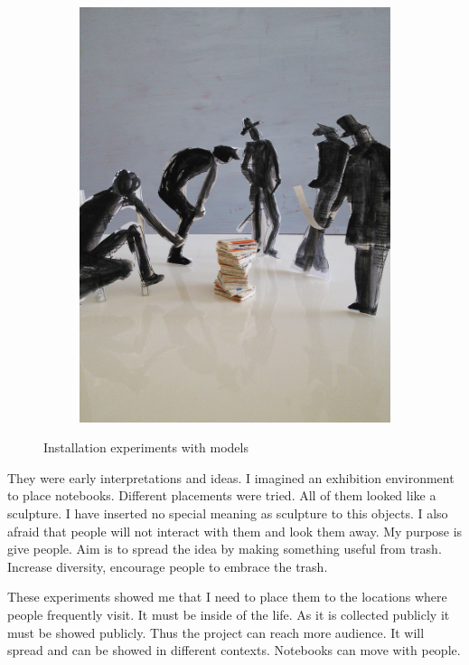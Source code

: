 \begin{figure}
\begin{subfigure}[b]{0.31\textwidth}
        \includegraphics[width=\textwidth]{project_graphics/exhibition3.jpg}
        \label{fig:exhibition3}
    \end{subfigure}
    \caption{Installation experiments with models}
    \label{fig:exhibition}
\end{figure}

They were early interpretations and ideas. I imagined an exhibition environment to place notebooks. Different placements were tried. All of them looked like a sculpture. I have inserted no special meaning as sculpture to this objects. I also afraid that people will not interact with them and look them away. My purpose is give people. Aim is to spread the idea by making something useful from trash. Increase diversity, encourage people to embrace the trash.

These experiments showed me that I need to place them to the locations where people frequently visit. It must be inside of the life. As it is collected publicly it must be showed publicly. Thus the project can reach more audience. It will spread and can be showed in different contexts. Notebooks can move with people.

